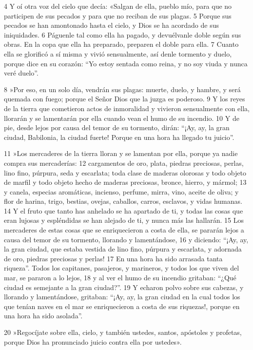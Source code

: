 \documentclass[12pt,twocolumn,twoside]{book}
\begin{document}
4 Y oí otra voz del cielo que decía: «Salgan de ella, pueblo mío, para que no participen de sus pecados y para que no reciban de sus plagas. 5 Porque sus pecados se han amontonado hasta el cielo, y Dios se ha acordado de sus iniquidades. 6 Páguenle tal como ella ha pagado, y devuélvanle doble según sus obras. En la copa que ella ha preparado, preparen el doble para ella. 7 Cuanto ella se glorificó a sí misma y vivió sensualmente, así denle tormento y duelo, porque dice en su corazón: “Yo estoy sentada como reina, y no soy viuda y nunca veré duelo”.

8 »Por eso, en un solo día, vendrán sus plagas: muerte, duelo, y hambre, y será quemada con fuego; porque el Señor Dios que la juzga es poderoso. 9 Y los reyes de la tierra que cometieron actos de inmoralidad y vivieron sensualmente con ella, llorarán y se lamentarán por ella cuando vean el humo de su incendio. 10 Y de pie, desde lejos por causa del temor de su tormento, dirán: “¡Ay, ay, la gran ciudad, Babilonia, la ciudad fuerte! Porque en una hora ha llegado tu juicio”.

11 »Los mercaderes de la tierra lloran y se lamentan por ella, porque ya nadie compra sus mercaderías: 12 cargamentos de oro, plata, piedras preciosas, perlas, lino fino, púrpura, seda y escarlata; toda clase de maderas olorosas y todo objeto de marfil y todo objeto hecho de maderas preciosas, bronce, hierro, y mármol; 13 y canela, especias aromáticas, incienso, perfume, mirra, vino, aceite de oliva; y flor de harina, trigo, bestias, ovejas, caballos, carros, esclavos, y vidas humanas. 14 Y el fruto que tanto has anhelado se ha apartado de ti, y todas las cosas que eran lujosas y espléndidas se han alejado de ti, y nunca más las hallarán. 15 Los mercaderes de estas cosas que se enriquecieron a costa de ella, se pararán lejos a causa del temor de su tormento, llorando y lamentándose, 16 y diciendo: “¡Ay, ay, la gran ciudad, que estaba vestida de lino fino, púrpura y escarlata, y adornada de oro, piedras preciosas y perlas! 17 En una hora ha sido arrasada tanta riqueza”. Todos los capitanes, pasajeros, y marineros, y todos los que viven del mar, se pararon a lo lejos, 18 y al ver el humo de su incendio gritaban: “¿Qué ciudad es semejante a la gran ciudad?”. 19 Y echaron polvo sobre sus cabezas, y llorando y lamentándose, gritaban: “¡Ay, ay, la gran ciudad en la cual todos los que tenían naves en el mar se enriquecieron a costa de sus riquezas!, porque en una hora ha sido asolada”.

20 »Regocíjate sobre ella, cielo, y también ustedes, santos, apóstoles y profetas, porque Dios ha pronunciado juicio contra ella por ustedes».
\end{document}
